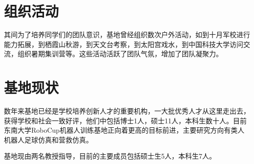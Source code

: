 \section{组织活动}
其间为了培养同学们的团队意识，基地曾经组织数次户外活动，如到十月军校进行能力拓展，到栖霞山秋游，到天文台考察，到太阳宫戏水，到中国科技大学访问交流，组织暑期集训营等。这些活动活跃了团队气氛，增加了团队凝聚力。


\section{基地现状}
数年来基地已经是学校培养创新人才的重要机构，一大批优秀人才从这里走出去，获得学校和社会一致好评，他们中包括博士1人，硕士11人，本科生数十人。目前东南大学RoboCup机器人训练基地正向着更高的目标前进，主要研究方向有类人机器人足球仿真和营救仿真。

基地现由两名教授指导，目前的主要成员包括硕士生5人，本科生7人。

\backmatter     %

%

